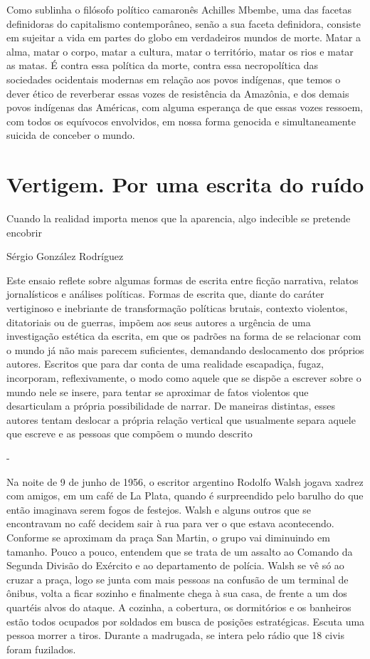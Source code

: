 Como sublinha o filósofo político camaronês Achilles Mbembe, uma das
facetas definidoras do capitalismo contemporâneo, senão a sua faceta
definidora, consiste em sujeitar a vida em partes do globo em
verdadeiros mundos de morte. Matar a alma, matar o corpo, matar a
cultura, matar o território, matar os rios e matar as matas. É contra
essa política da morte, contra essa necropolítica das sociedades
ocidentais modernas em relação aos povos indígenas, que temos o dever
ético de reverberar essas vozes de resistência da Amazônia, e dos demais
povos indígenas das Américas, com alguma esperança de que essas vozes
ressoem, com todos os equívocos envolvidos, em nossa forma genocida e
simultaneamente suicida de conceber o mundo.

\chapter{Vertigem. Por uma escrita do ruído}

\epigraph{Cuando la realidad importa menos que la aparencia, algo indecible
se pretende encobrir}{Sérgio González Rodríguez}

Este ensaio reflete sobre algumas formas de escrita entre ficção
narrativa, relatos jornalísticos e análises políticas. Formas de escrita
que, diante do caráter vertiginoso e inebriante de transformação
políticas brutais, contexto violentos, ditatoriais ou de guerras, impõem
aos seus autores a urgência de uma investigação estética da escrita, em
que os padrões na forma de se relacionar com o mundo já não mais parecem
suficientes, demandando deslocamento dos próprios autores. Escritos que
para dar conta de uma realidade escapadiça, fugaz, incorporam,
reflexivamente, o modo como aquele que se dispõe a escrever sobre o
mundo nele se insere, para tentar se aproximar de fatos violentos que
desarticulam a própria possibilidade de narrar. De maneiras distintas,
esses autores tentam deslocar a própria relação vertical que usualmente
separa aquele que escreve e as pessoas que compõem o mundo descrito

-

Na noite de 9 de junho de 1956, o escritor argentino Rodolfo Walsh
jogava xadrez com amigos, em um café de La Plata, quando é surpreendido
pelo barulho do que então imaginava serem fogos de festejos. Walsh e
alguns outros que se encontravam no café decidem sair à rua para ver o
que estava acontecendo. Conforme se aproximam da praça San Martin, o
grupo vai diminuindo em tamanho. Pouco a pouco, entendem que se trata de
um assalto ao Comando da Segunda Divisão do Exército e ao departamento
de polícia. Walsh se vê só ao cruzar a praça, logo se junta com mais
pessoas na confusão de um terminal de ônibus, volta a ficar sozinho e
finalmente chega à sua casa, de frente a um dos quartéis alvos do
ataque. A cozinha, a cobertura, os dormitórios e os banheiros estão
todos ocupados por soldados em busca de posições estratégicas. Escuta
uma pessoa morrer a tiros. Durante a madrugada, se intera pelo rádio que
18 civis foram fuzilados.

